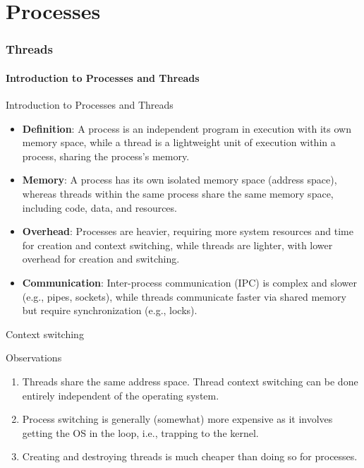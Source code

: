 \part{Processes}
\section{Threads}
\subsection{Introduction to Processes and Threads}
\begin{slide}{Introduction to Processes and Threads}
    \begin{itemize}
    \item \textbf{Definition}: A process is an independent program in execution with its own memory space, while a thread is a lightweight unit of execution within a process, sharing the process's memory.
    \item \textbf{Memory}: A process has its own isolated memory space (address space), whereas threads within the same process share the same memory space, including code, data, and resources.
    \item \textbf{Overhead}: Processes are heavier, requiring more system resources and time for creation and context switching, while threads are lighter, with lower overhead for creation and switching.
    \item \textbf{Communication}: Inter-process communication (IPC) is complex and slower (e.g., pipes, sockets), while threads communicate faster via shared memory but require synchronization (e.g., locks).      
  \end{itemize}
\end{slide}
\begin{slide}{Context switching}
  \begin{block}{Observations}
    \begin{enumerate}
    \item Threads share the same address space. Thread context switching can be done entirely independent of
      the operating system.
    \item Process switching is generally (somewhat) more expensive as it involves getting the OS in the loop,
      i.e., trapping to the kernel.
    \item Creating and destroying threads is much cheaper than doing so for processes.
    \end{enumerate}
  \end{block}
\end{slide}
